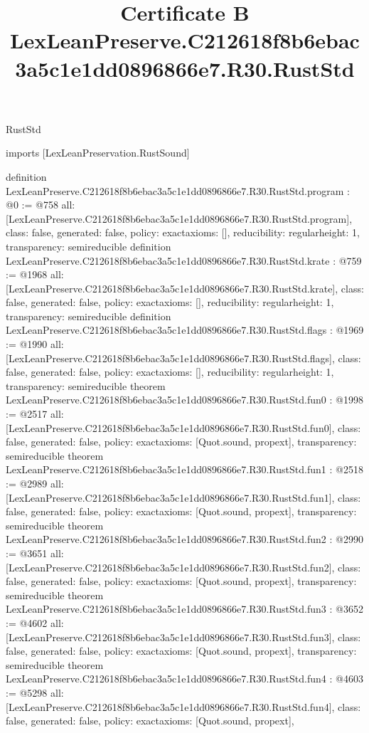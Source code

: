 \begin{lexlean}{RustStd}
\title{Certificate B LexLeanPreserve.C212618f8b6ebac3a5c1e1dd0896866e7.R30.RustStd}
\begin{coremodule}
imports [LexLeanPreservation.RustSound]

definition LexLeanPreserve.C212618f8b6ebac3a5c1e1dd0896866e7.R30.RustStd.program : @0 := @758 {
  all: [LexLeanPreserve.C212618f8b6ebac3a5c1e1dd0896866e7.R30.RustStd.program],
  class: false,
  generated: false,
  policy: exact{axioms: []},
  reducibility: regular{height: 1},
  transparency: semireducible
}
definition LexLeanPreserve.C212618f8b6ebac3a5c1e1dd0896866e7.R30.RustStd.krate : @759 := @1968 {
  all: [LexLeanPreserve.C212618f8b6ebac3a5c1e1dd0896866e7.R30.RustStd.krate],
  class: false,
  generated: false,
  policy: exact{axioms: []},
  reducibility: regular{height: 1},
  transparency: semireducible
}
definition LexLeanPreserve.C212618f8b6ebac3a5c1e1dd0896866e7.R30.RustStd.flags : @1969 := @1990 {
  all: [LexLeanPreserve.C212618f8b6ebac3a5c1e1dd0896866e7.R30.RustStd.flags],
  class: false,
  generated: false,
  policy: exact{axioms: []},
  reducibility: regular{height: 1},
  transparency: semireducible
}
theorem LexLeanPreserve.C212618f8b6ebac3a5c1e1dd0896866e7.R30.RustStd.fun0 : @1998 := @2517 {
  all: [LexLeanPreserve.C212618f8b6ebac3a5c1e1dd0896866e7.R30.RustStd.fun0],
  class: false,
  generated: false,
  policy: exact{axioms: [Quot.sound, propext]},
  transparency: semireducible
}
theorem LexLeanPreserve.C212618f8b6ebac3a5c1e1dd0896866e7.R30.RustStd.fun1 : @2518 := @2989 {
  all: [LexLeanPreserve.C212618f8b6ebac3a5c1e1dd0896866e7.R30.RustStd.fun1],
  class: false,
  generated: false,
  policy: exact{axioms: [Quot.sound, propext]},
  transparency: semireducible
}
theorem LexLeanPreserve.C212618f8b6ebac3a5c1e1dd0896866e7.R30.RustStd.fun2 : @2990 := @3651 {
  all: [LexLeanPreserve.C212618f8b6ebac3a5c1e1dd0896866e7.R30.RustStd.fun2],
  class: false,
  generated: false,
  policy: exact{axioms: [Quot.sound, propext]},
  transparency: semireducible
}
theorem LexLeanPreserve.C212618f8b6ebac3a5c1e1dd0896866e7.R30.RustStd.fun3 : @3652 := @4602 {
  all: [LexLeanPreserve.C212618f8b6ebac3a5c1e1dd0896866e7.R30.RustStd.fun3],
  class: false,
  generated: false,
  policy: exact{axioms: [Quot.sound, propext]},
  transparency: semireducible
}
theorem LexLeanPreserve.C212618f8b6ebac3a5c1e1dd0896866e7.R30.RustStd.fun4 : @4603 := @5298 {
  all: [LexLeanPreserve.C212618f8b6ebac3a5c1e1dd0896866e7.R30.RustStd.fun4],
  class: false,
  generated: false,
  policy: exact{axioms: [Quot.sound, propext]},
}
\end{coremodule}
\end{lexlean}
